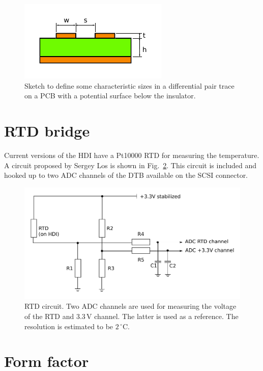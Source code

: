 \begin{figure}[hbtp]
	\begin{center}
	\includegraphics[width=.4\textwidth]{img/diffpair.pdf}
	\end{center}
	\caption{Sketch to define some characteristic sizes in a differential pair trace on a PCB with a potential surface below the insulator.}
	\label{fig:diffpair}
\end{figure}


\section{RTD bridge}
Current versions of the HDI have a Pt10000 RTD for measuring the temperature. A circuit proposed by Sergey Los is shown in Fig.~\ref{fig:RTDcircuit}. This circuit is included and hooked up to two ADC channels of the DTB available on the SCSI connector.

\begin{figure}[hbtp]
	\begin{center}
	\includegraphics[width=.7\textwidth]{img/RTDcircuit.pdf}
	\end{center}
	\caption{RTD circuit. Two ADC channels are used for measuring the voltage of the RTD and 3.3\,V channel. The latter is used as a reference. The resolution is estimated to be $2\,^\circ$C.}
	\label{fig:RTDcircuit}
\end{figure}


\section{Form factor}

